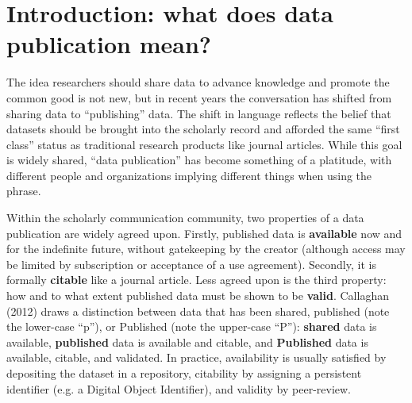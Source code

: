 \documentclass[10pt,a4paper,twocolumn]{article}
\begin{document}
\section*{Introduction: what does data publication mean?}\label{introduction}

The idea researchers should share data to advance knowledge and promote the common good is not new, but in recent years the conversation has shifted from sharing data to ``publishing'' data.\cite{costello_motivating_2009,smith_data_2009,lawrence_data_2011,callaghan_making_2012} %
The shift in language reflects the belief that datasets should be brought into the scholarly record and afforded the same ``first class'' status as traditional research products like journal articles.  
While this goal is widely shared, ``data publication'' has become something of a platitude, with different people and organizations implying different things when using the phrase. %

Within the scholarly communication community, two properties of a data publication are widely agreed upon.\cite{smith_data_2009,callaghan_making_2012}
Firstly, published data is \textbf{available} now and for the indefinite future, without gatekeeping by the creator (although access may be limited by subscription or acceptance of a use agreement).
Secondly, it is formally \textbf{citable} like a journal article.
Less agreed upon is the third property: how and to what extent published data must be shown to be \textbf{valid}.
Callaghan (2012)\cite{callaghan_making_2012} draws a distinction between data that has been shared, published (note the lower-case ``p''), or Published (note the upper-case ``P''): \textbf{shared} data is available, \textbf{published} data is available and citable, and \textbf{Published} data is available, citable, and validated. 
In practice, availability is usually satisfied by depositing the dataset in a repository, citability by assigning a persistent identifier (e.g. a Digital Object Identifier), and validity by peer-review.

\end{document}

